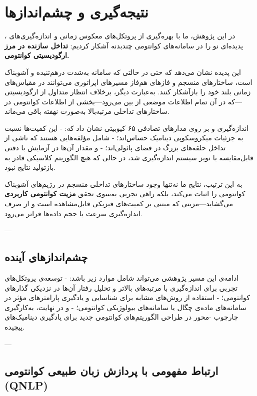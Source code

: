 \section{نتیجه‌گیری و چشم‌اندازها}
\label{sec:conclusion}

در این پژوهش، ما با بهره‌گیری از پروتکل‌های معکوس زمانی و اندازه‌گیری‌های ، پدیده‌ای نو را در سامانه‌های کوانتومی چندبدنه آشکار کردیم:  
\textbf{تداخل سازنده در مرز ارگودیسیتی کوانتومی.}

این پدیده نشان می‌دهد که حتی در حالتی که سامانه به‌شدت درهم‌تنیده و آشوبناک است، ساختارهای منسجم و فازهای هم‌فاز مسیرهای اپراتوری می‌توانند در مقیاس‌های زمانی بلند خود را بازآشکار کنند.  
به‌عبارت دیگر، برخلاف انتظار متداول از ارگودیسیتی—که در آن تمام اطلاعات موضعی از بین می‌رود—بخشی از اطلاعات کوانتومی در ساختارهای تداخلی مرتبه‌بالا به‌صورت نهفته باقی می‌ماند.

اندازه‌گیری  و  بر روی مدارهای تصادفی ۶۵ کیوبیتی نشان داد که:
- این کمیت‌ها نسبت به جزئیات میکروسکوپی دینامیک حساس‌اند؛  
- شامل مؤلفه‌هایی هستند که ناشی از تداخل حلقه‌های بزرگ در فضای پائولی‌اند؛  
- و مقدار آن‌ها در آزمایش با دقتی قابل‌مقایسه با نویز سیستم اندازه‌گیری شد، در حالی که هیچ الگوریتم کلاسیکی قادر به بازتولید نتایج نبود.

به این ترتیب، نتایج ما نه‌تنها وجود ساختارهای تداخلی منسجم در رژیم‌های آشوبناک کوانتومی را اثبات می‌کند، بلکه راهی تجربی به‌سوی تحقق \textbf{مزیت کوانتومی کاربردی} می‌گشاید—مزیتی که مبتنی بر کمیت‌های فیزیکی قابل‌مشاهده است و از صرف اندازه‌گیری سرعت یا حجم داده‌ها فراتر می‌رود.

---

\subsection{چشم‌اندازهای آینده}

ادامه‌ی این مسیر پژوهشی می‌تواند شامل موارد زیر باشد:
- توسعه‌ی پروتکل‌های تجربی برای اندازه‌گیری  با مرتبه‌های بالاتر و تحلیل رفتار آن‌ها در نزدیکی گذارهای کوانتومی؛  
- استفاده از روش‌های مشابه برای شناسایی و یادگیری پارامترهای مؤثر در سامانه‌های ماده‌ی چگال یا سامانه‌های بیولوژیکی کوانتومی؛  
- و در نهایت، به‌کارگیری چارچوب -محور در طراحی الگوریتم‌های کوانتومی جدید برای یادگیری دینامیک‌های پیچیده.

---

\subsection{ارتباط مفهومی با پردازش زبان طبیعی کوانتومی (QNLP)}

